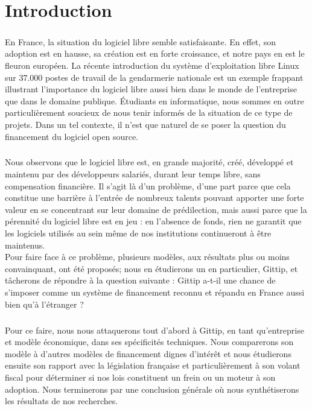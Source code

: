 \chapter*{Introduction}

\paragraph{}
En France, la situation du logiciel libre semble satisfaisante.
En effet, son adoption est en hausse, sa création est en forte croissance,
et notre pays en est le fleuron européen.
La récente introduction du système d'exploitation libre Linux sur 37.000
postes de travail de la gendarmerie nationale est un exemple frappant
illustrant l'importance du logiciel libre aussi bien dans le monde de
l'entreprise que dans le domaine publique.
Étudiants en informatique, nous sommes en outre particulièrement soucieux
de nous tenir informés de la situation de ce type de projets.
Dans un tel contexte, il n'est que naturel de se poser la question du
financement du logiciel open source.

\paragraph{}
Nous observons que le logiciel libre est, en grande majorité, créé,
développé et maintenu par des développeurs salariés, durant leur temps
libre, sans compensation financière. Il s'agit là d'un problème, d'une
part parce que cela constitue une barrière à l'entrée de nombreux talents
pouvant apporter une forte valeur en se concentrant sur leur domaine de
prédilection, mais aussi parce que la pérennité du logiciel libre est en
jeu : en l'absence de fonds, rien ne garantit que les logiciels utilisés
au sein même de nos institutions continueront à être maintenus.\\
Pour faire face à ce problème, plusieurs modèles, aux résultats plus ou
moins convainquant, ont été proposés; nous en étudierons un en
particulier, Gittip, et tâcherons de répondre à la question suivante :
Gittip a-t-il une chance de s'imposer comme un système de financement
reconnu et répandu en France aussi bien qu'à l'étranger ?

\paragraph{}
Pour ce faire, nous nous attaquerons tout d'abord à Gittip, en tant
qu'entreprise et modèle économique, dans ses spécificités techniques.
Nous comparerons son modèle à d'autres modèles de financement
dignes d'intérêt et nous étudierons ensuite son rapport avec la législation
française et particulièrement à son volant fiscal pour déterminer si nos
lois constituent un frein ou un moteur à son adoption.
Nous terminerons par une conclusion générale où nous synthétiserons
les résultats de nos recherches.
